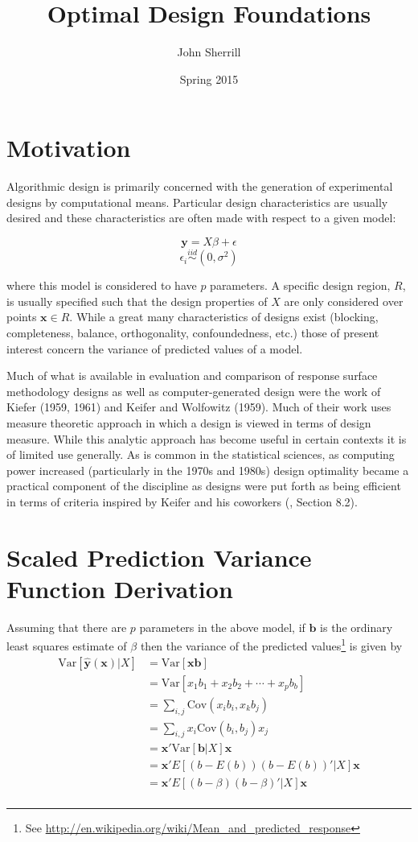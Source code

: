 \documentclass{article}\usepackage[]{graphicx}\usepackage[]{color}
\title{\vspace{-70pt} Optimal Design Foundations \vspace{-10pt}}
\author{John Sherrill\vspace{-20pt}}
\date{Spring 2015 \vspace{-10pt}}
\newcommand{\Var}{\mathrm{Var}}
\newcommand{\Cov}{\mathrm{Cov}}
\begin{document}
\maketitle

\section{Motivation}

Algorithmic design is primarily concerned with the generation of experimental designs by computational means. Particular design characteristics are usually desired and these characteristics are often made with respect to a given model:

$$ \textbf{y} = X\beta + \epsilon $$
$$ \epsilon_i \stackrel{iid}{\sim} (0, \sigma^2) $$

\noindent where this model is considered to have $p$ parameters. A specific design region, $R$, is usually specified such that the design properties of $X$ are only considered over points $\textbf{x} \in R$. While a great many characteristics of designs exist (blocking, completeness, balance, orthogonality, confoundedness, etc.) those of present interest concern the variance of predicted values of a model.

Much of what is available in evaluation and comparison of response surface methodology designs as well as computer-generated design were the work of Kiefer (1959, 1961) and Keifer and Wolfowitz (1959). Much of their work uses measure theoretic approach in which a design is viewed in terms of design measure. While this analytic approach has become useful in certain contexts it is of limited use generally. As is common in the statistical sciences, as computing power increased (particularly in the 1970s and 1980s) design optimality became a practical component of the discipline as designs were put forth as being efficient in terms of criteria inspired by Keifer and his coworkers (\cite{myers}, Section 8.2).

\section{Scaled Prediction Variance Function Derivation}

Assuming that there are $p$ parameters in the above model, if $\textbf{b}$ is the ordinary least squares estimate of $\beta$ then the variance of the predicted values\footnote{See \url{http://en.wikipedia.org/wiki/Mean_and_predicted_response}} is given by
\begin{align*}
  \Var[\hat{\textbf{y}}(\textbf{x}) | X] &= \Var[\textbf{xb}] \\
  &= \Var[x_1 b_1 + x_2 b_2 + \cdots + x_p b_b] \\
  &= \sum_{i,j} \Cov(x_i b_i, x_k b_j) \\
  &= \sum_{i,j} x_i \Cov(b_i, b_j) x_j \\
  &= \textbf{x}' \Var[\textbf{b} | X] \textbf{x} \\
  &= \textbf{x}' E[(b-E(b)) (b-E(b))' | X] \textbf{x} \\
  &= \textbf{x}' E[(b-\beta)(b-\beta)' | X] \textbf{x} \\
\end{align*}
\end{document}

